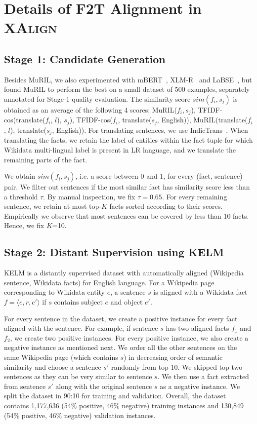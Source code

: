\documentclass[11pt]{article}
\begin{document}
\section{Details of F2T Alignment in \textsc{XAlign}}
\subsection{Stage 1: Candidate Generation}
Besides MuRIL, we also experimented with mBERT~\cite{devlin2019bert}, XLM-R~\cite{conneau2020unsupervised} and LaBSE~\cite{feng2020language}, but found MuRIL to perform the best on a small dataset of 500 examples, separately annotated for Stage-1 quality evaluation. The similarity score $sim(f_i,s_j)$ is  obtained as an average of the following 4 scores: MuRIL($f_i,s_j$), TFIDF-cos(translate($f_i$, $l$), $s_j$), TFIDF-cos($f_i$, translate($s_j$, English)), MuRIL(translate($f_i$, $l$), translate($s_j$, English)). For translating sentences, we use IndicTrans~\cite{ramesh2021samanantar}. When translating the facts, we retain the label of entities within the fact tuple for which Wikidata multi-lingual label is present in LR language, and we translate the remaining parts of the fact. 

We obtain $sim(f_i,s_j)$, i.e. a score between 0 and 1, for every (fact, sentence) pair. We filter out sentences if the most similar fact has similarity score less than a threshold $\tau$. By manual inspection, we fix $\tau=0.65$. For every remaining sentence, we retain at most top-$K$ facts sorted according to their scores. Empirically we observe that most sentences can be covered by less than 10 facts. Hence, we fix $K$=10. 

\subsection{Stage 2: Distant Supervision using KELM}
KELM is a distantly supervised dataset with automatically aligned (Wikipedia sentence, Wikidata facts) for English language. For a Wikipedia page corresponding to Wikidata entity $e$, a sentence $s$ is aligned with a Wikidata fact $f=\langle e, r, e'\rangle$ if $s$ contains subject $e$ and object $e'$.  

For every sentence in the dataset, we create a positive instance for every fact aligned with the sentence. For example, if sentence $s$ has two aligned facts $f_1$ and $f_2$, we create two positive instances. For every positive instance, we also create a negative instance as mentioned next. We order all the other sentences on the same Wikipedia page (which contains $s$) in decreasing order of semantic similarity and choose a sentence $s'$ randomly from top 10. We skipped top two sentences as they can be very similar to sentence $s$. We then use a fact extracted from sentence $s'$ along with the original sentence $s$ as a negative instance. We split the dataset in 90:10 for training and validation. Overall, the dataset contains 1,177,636 (54\% positive, 46\% negative) training instances and 130,849 (54\% positive, 46\% negative) validation instances.
\end{document}
